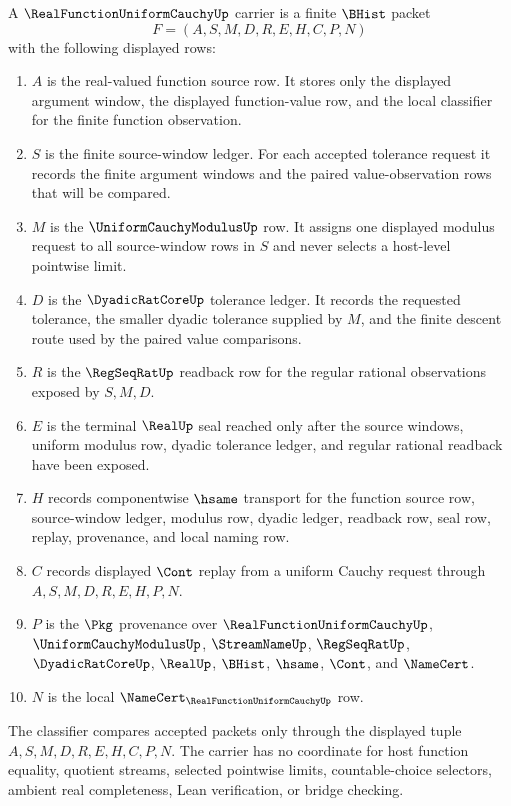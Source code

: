 \begin{definition}\label{def:real-function-uniform-cauchy-carrier}
A $\RealFunctionUniformCauchyUp$ carrier is a finite $\BHist$ packet
$$
F=(A,S,M,D,R,E,H,C,P,N)
$$
with the following displayed rows:
\begin{enumerate}
\item $A$ is the real-valued function source row. It stores only the displayed argument window, the displayed function-value row, and the local classifier for the finite function observation.
\item $S$ is the finite source-window ledger. For each accepted tolerance request it records the finite argument windows and the paired value-observation rows that will be compared.
\item $M$ is the $\UniformCauchyModulusUp$ row. It assigns one displayed modulus request to all source-window rows in $S$ and never selects a host-level pointwise limit.
\item $D$ is the $\DyadicRatCoreUp$ tolerance ledger. It records the requested tolerance, the smaller dyadic tolerance supplied by $M$, and the finite descent route used by the paired value comparisons.
\item $R$ is the $\RegSeqRatUp$ readback row for the regular rational observations exposed by $S,M,D$.
\item $E$ is the terminal $\RealUp$ seal reached only after the source windows, uniform modulus row, dyadic tolerance ledger, and regular rational readback have been exposed.
\item $H$ records componentwise $\hsame$ transport for the function source row, source-window ledger, modulus row, dyadic ledger, readback row, seal row, replay, provenance, and local naming row.
\item $C$ records displayed $\Cont$ replay from a uniform Cauchy request through $A,S,M,D,R,E,H,P,N$.
\item $P$ is the $\Pkg$ provenance over $\RealFunctionUniformCauchyUp$, $\UniformCauchyModulusUp$, $\StreamNameUp$, $\RegSeqRatUp$, $\DyadicRatCoreUp$, $\RealUp$, $\BHist$, $\hsame$, $\Cont$, and $\NameCert$.
\item $N$ is the local $\NameCert_{\RealFunctionUniformCauchyUp}$ row.
\end{enumerate}
The classifier compares accepted packets only through the displayed tuple $A,S,M,D,R,E,H,C,P,N$. The carrier has no coordinate for host function equality, quotient streams, selected pointwise limits, countable-choice selectors, ambient real completeness, Lean verification, or bridge checking.
\end{definition}

